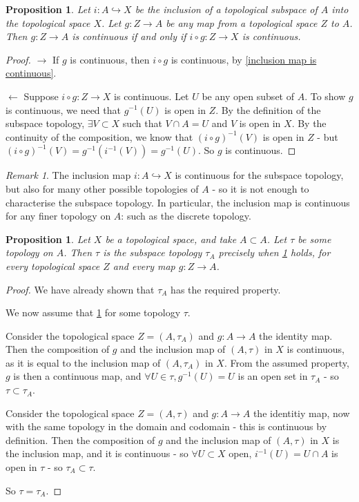 \documentclass{article}
\theoremstyle{definition}
\theoremstyle{plain}%
\newtheorem{prop}[thm]{Proposition}
\theoremstyle{remark}
\newtheorem*{rem}{Remark}
\newcommand{\intersection}{\cap}
\newcommand{\injection}{\hookrightarrow}
\begin{document}
\begin{prop}\label{inclusion continuous iff composition continuous}
    Let $i : A \injection X$ be the inclusion of a topological subspace of $A$ into the topological space $X$. Let $g : Z \to A$ be any map from a topological space $Z$ to $A$. Then $g : Z \to A$ is continuous if and only if $i \circ g : Z \to X$ is continuous.
\end{prop}

\begin{proof} $ \rightarrow $ If $g$ is continuous, then $i \circ g$ is continuous, by \ref{inclusion map is continuous}.

    $ \leftarrow $ Suppose $i \circ g : Z \to X$ is continuous. Let $U$ be any open subset of $A$. To show $g$ is continuous, we need that $g^{-1}(U)$ is open in $Z$. By the definition of the subspace topology, $\exists V \subset X$ such that $V \intersection A = U$ and $V$ is open in $X$. By the continuity of the composition, we know that $(i \circ g)^{-1}(V)$ is open in $Z$ - but $(i \circ g)^{-1}(V) = g^{-1}(i^{-1}(V)) = g^{-1}(U)$. So $g$ is continuous.
\end{proof}

\begin{rem}
    The inclusion map $i : A \injection X$ is continuous for the subspace topology, but also for many other possible topologies of $A$ - so it is not enough to characterise the subspace topology. In particular, the inclusion map is continuous for any finer topology on $A$: such as the discrete topology.
\end{rem}

\begin{prop}
    Let $X$ be a topological space, and take $A \subset A$. Let $\tau$ be some topology on $A$. Then $\tau$ is the subspace topology $\tau_A$ precisely when \ref{inclusion continuous iff composition continuous} holds, for every topological space $Z$ and every map $g: Z \to A$.
\end{prop}

\begin{proof}
    We have already shown that $\tau_A$ has the required property.

    We now assume that \ref{inclusion continuous iff composition continuous} for some topology $\tau$.

    Consider the topological space $Z = (A, \tau_A)$ and $g : A \to A$ the identity map. Then the composition of $g$ and the inclusion map of $(A, \tau)$ in $X$ is continuous, as it is equal to the inclusion map of $(A, \tau_A)$ in $X$. From the assumed property, $g$ is then a continuous map, and $\forall U \in \tau, g^{-1}(U) = U$ is an open set in $\tau_A$ - so $\tau \subset \tau_A$.

    Consider the topological space $Z = (A, \tau)$ and $g : A \to A$ the identitiy map, now with the same topology in the domain and codomain - this is continuous by definition. Then the composition of $g$ and the inclusion map of $(A, \tau)$ in $X$ is the inclusion map, and it is continuous - so $\forall U \subset X$ open, $i^{-1}(U) = U \intersection A$ is open in $\tau$ - so $\tau_A \subset \tau$.

    So $\tau = \tau_A$.
\end{proof}
\end{document}
